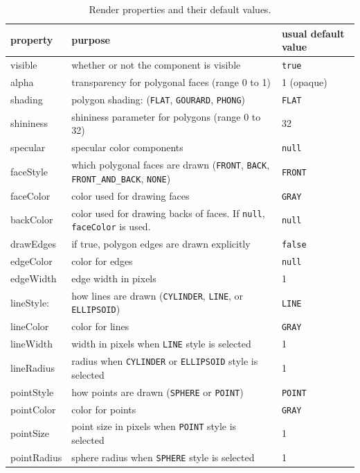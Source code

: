 \begin{table}
\begin{center}
\begin{tabular}{|lll|}
\hline property & purpose & usual default value \\ \hline
visible & whether or not the component is visible & {\tt true} \\
alpha & transparency for polygonal faces (range 0 to 1) & 1 (opaque) \\
shading & polygon shading: ({\tt FLAT}, {\tt GOURARD}, {\tt PHONG}) & {\tt FLAT}\\
shininess & shininess parameter for polygons (range 0 to 32) & 32 \\
specular & specular color components & {\tt null} \\
\hline
faceStyle &
which polygonal faces are drawn ({\tt FRONT}, {\tt BACK},
{\tt FRONT\_AND\_BACK}, {\tt NONE}) & {\tt FRONT} \\
faceColor &
color used for drawing faces & {\tt GRAY} \\
backColor &
color used for drawing backs of faces. If {\tt null}, {\tt faceColor} is used. &
{\tt null} \\
drawEdges & if true, polygon edges are drawn explicitly & {\tt false} \\
\hline
edgeColor & color for edges & {\tt null} \\
edgeWidth & edge width in pixels & 1 \\
\hline
lineStyle: &
how lines are drawn ({\tt CYLINDER}, {\tt LINE}, or {\tt ELLIPSOID}) & 
{\tt LINE} \\
lineColor & color for lines & {\tt GRAY} \\
lineWidth & width in pixels when {\tt LINE} style is selected & 1 \\
lineRadius & radius when {\tt CYLINDER} or {\tt ELLIPSOID} style is selected &
1 \\
\hline
pointStyle & how points are drawn ({\tt SPHERE} or {\tt POINT}) & {\tt POINT} \\
pointColor & color for points & {\tt GRAY} \\
pointSize & point size in pixels when {\tt POINT} style is selected & 1 \\
pointRadius & sphere radius when {\tt SPHERE} style is selected & 1 \\
\hline
\end{tabular}
\end{center}
\caption{Render properties and their default values.}
\label{RenderProps:tab}
\end{table}


